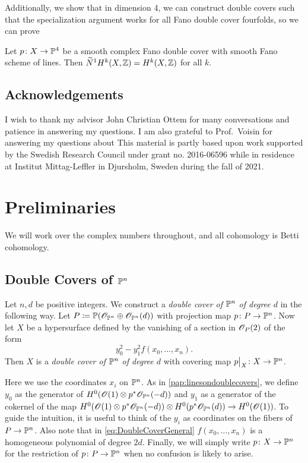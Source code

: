  Additionally, we show that in dimension 4, we can construct double covers such that the specialization argument works for all Fano double cover fourfolds, so we can prove

\begin{theorem}
  \label{thm:IntroductionFourfolds}
  Let $p \from X \to \P^4$ be a smooth complex Fano double cover with smooth Fano scheme of lines. Then $\widetilde{N}^1H^k(X,\Z) = H^k(X,\Z)$ for all $k$.
\end{theorem}


\subsection*{Acknowledgements}
I wish to thank my advisor John Christian Ottem for many conversations and patience in answering my questions. I am also grateful to Prof.\ Voisin for answering my questions about \cite{VoisinConiveauThreefolds} This material is partly based upon work supported by the Swedish Research Council under grant no. 2016-06596 while in residence at Institut Mittag-Leffler in Djursholm, Sweden during the fall of 2021.


\section{Preliminaries}
We will work over the complex numbers throughout, and all cohomology is Betti cohomology.
\subsection{Double Covers of $\P^n$} 
\begin{definition}
	Let $n,d$ be positive integers. We construct a \emph{double cover of $\P^n$ of degree $d$} in the following way. Let $P \coloneqq \P(\sO_{\P^n}\oplus \sO_{\P^n}(d))$ with projection map $p \from P \to \P^n$. Now let $X$ be a hypersurface defined by the vanishing of a section in $\sO_P(2)$ of the form 
	\begin{equation}
		\label{eq:DoubleCoverGeneral}
		y_0^2 - y_1^2f(x_0,\dots,x_n).
	\end{equation}
Then $X$ is a \emph{double cover of $\P^n$ of degree $d$} with covering map $\restr{p}{X} \from X \to \P^n$.
\end{definition}
Here we use the coordinates $x_i$ on $\P^n$. As in \cref{pap:linesondoublecovers}, we define $y_0$ as the generator of $H^0(\sO(1) \otimes p^* \sO_{\P^n}(-d))$ and $y_1$ as a generator of the cokernel of the map $H^0(\sO(1) \otimes p^* \sO_{\P^n}(-d)) \otimes H^0(p^* \sO_{\P^n}(d)) \to H^0(\sO(1))$. To guide the intuition, it is useful to think of the $y_i$ as coordinates on the fibers of $P \to \P^n$. Also note that in \eqref{eq:DoubleCoverGeneral} $f(x_0,\dots,x_n)$ is a homogeneous polynomial of degree $2d$. Finally, we will simply write $p \from X \to \P^n$ for the restriction of $p \from P \to \P^n$ when no confusion is likely to arise.

